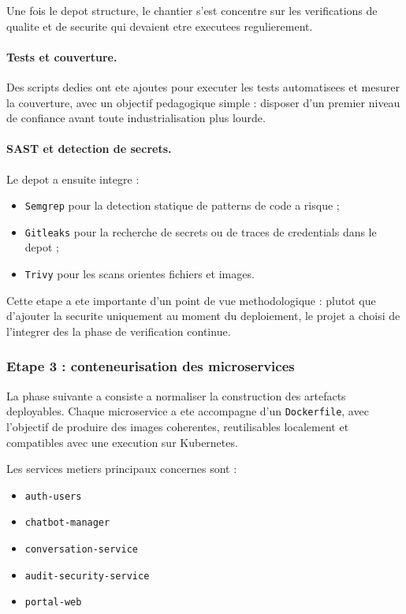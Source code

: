 Une fois le depot structure, le chantier s'est concentre sur les verifications de qualite et de securite qui devaient etre executees regulierement.

\paragraph{Tests et couverture.}
Des scripts dedies ont ete ajoutes pour executer les tests automatisees et mesurer la couverture, avec un objectif pedagogique simple : disposer d'un premier niveau de confiance avant toute industrialisation plus lourde.

\paragraph{SAST et detection de secrets.}
Le depot a ensuite integre :

\begin{itemize}
  \item \texttt{Semgrep} pour la detection statique de patterns de code a risque ;
  \item \texttt{Gitleaks} pour la recherche de secrets ou de traces de credentials dans le depot ;
  \item \texttt{Trivy} pour les scans orientes fichiers et images.
\end{itemize}

Cette etape a ete importante d'un point de vue methodologique : plutot que d'ajouter la securite uniquement au moment du deploiement, le projet a choisi de l'integrer des la phase de verification continue.

\subsubsection{Etape 3 : conteneurisation des microservices}

La phase suivante a consiste a normaliser la construction des artefacts deployables. Chaque microservice a ete accompagne d'un \texttt{Dockerfile}, avec l'objectif de produire des images coherentes, reutilisables localement et compatibles avec une execution sur Kubernetes.

Les services metiers principaux concernes sont :

\begin{itemize}
  \item \texttt{auth-users}
  \item \texttt{chatbot-manager}
  \item \texttt{conversation-service}
  \item \texttt{audit-security-service}
  \item \texttt{portal-web}
\end{itemize}

